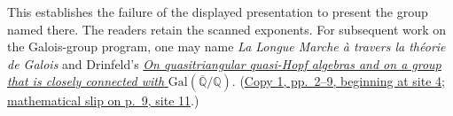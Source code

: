 This establishes the
failure of the displayed presentation to present the group named there.
The readers retain the scanned exponents. For subsequent work on the
Galois-group program, one may name \emph{La Longue Marche à travers la
théorie de Galois} and Drinfeld's
\href{https://www.mathnet.ru/eng/aa199}{\emph{On quasitriangular quasi-Hopf algebras and on a group that is closely connected with}
$\mathrm{Gal}(\overline{\mathbb Q}/\mathbb Q)$}.
(\href{https://grothendieck.umontpellier.fr/web/viewer.html?file=../119.pdf\#page=5}{Copy 1, pp.~2--9, beginning at site 4};
\href{https://grothendieck.umontpellier.fr/web/viewer.html?file=../119.pdf\#page=12}{mathematical slip on p.~9, site 11}.)

